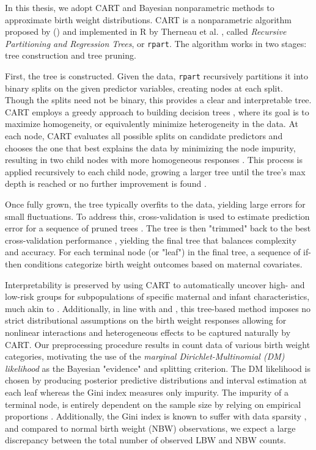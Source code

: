 In this thesis, we adopt CART and Bayesian nonparametric methods to approximate birth weight distributions. CART is a nonparametric algorithm proposed by \textcite{breiman1984classification} (\citeyear{breiman1984classification}) and implemented in R by Therneau et al. \parencite{intro_to_rpart}, called \textit{Recursive Partitioning and Regression Trees}, or \texttt{rpart}. The algorithm works in two stages: tree construction and tree pruning. 
 
First, the tree is constructed. Given the data, \texttt{rpart} recursively partitions it into binary splits on the given predictor variables, creating nodes at each split. Though the splits need not be binary, this provides a clear and interpretable tree. CART employs a greedy approach to building decision trees \parencite{cart_greedy}, where its goal is to maximize homogeneity, or equivalently minimize heterogeneity in the data. At each node, CART evaluates all possible splits on candidate predictors and chooses the one that best explains the data by minimizing the node impurity, resulting in two child nodes with more homogeneous responses \parencite{intro_to_rpart}. This process is applied recursively to each child node, growing a larger tree until the tree's max depth is reached or no further improvement is found \parencite{intro_to_rpart}.

Once fully grown, the tree typically overfits to the data, yielding large errors for small fluctuations. To address this, cross-validation is used to estimate prediction error for a sequence of pruned trees \parencite{intro_to_rpart}. The tree is then "trimmed" back to the best cross-validation performance \parencite{intro_to_rpart}, yielding the final tree that balances complexity and accuracy. For each terminal node (or "leaf") in the final tree, a sequence of if-then conditions categorize birth weight outcomes based on maternal covariates.

Interpretability is preserved by using CART to automatically uncover high- and low-risk groups for subpopulations of specific maternal and infant characteristics, much akin to \textcite{KITSANTAS2006275}. Additionally, in line with \textcite{dunson2008} and \textcite{jain2024}, this tree-based method imposes no strict distributional assumptions on the birth weight responses allowing for nonlinear interactions and heterogeneous effects to be captured naturally by CART. Our preprocessing procedure results in count data of various birth weight categories, motivating the use of the \emph{marginal Dirichlet-Multinomial (DM) likelihood} as the Bayesian "evidence" and splitting criterion. The DM likelihood is chosen by producing posterior predictive distributions and interval estimation at each leaf whereas the Gini index measures only impurity. The impurity of a terminal node, is entirely dependent on the sample size by relying on empirical proportions \parencite{stackexchangeGiniDecrease}. Additionally, the Gini index is known to suffer with data sparsity \parencite{ekamperiDecisionTrees}, and compared to normal birth weight (NBW) observations, we expect a large discrepancy between the total number of observed LBW and NBW counts.

